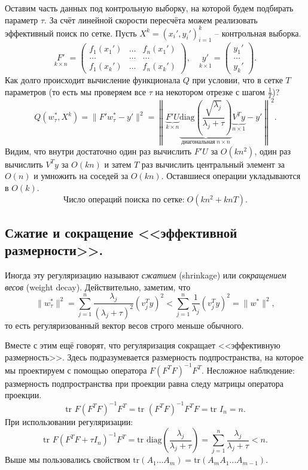 Оставим часть данных под контрольную выборку, на которой будем подбирать параметр $\tau$. За счёт линейной скорости пересчёта можем реализовать эффективный поиск по сетке. Пусть $X^k = (x_i', y_i')_{i=1}^k$ -- контрольная выборка.
$$\underset{k \times n}{F'} = \begin{pmatrix}
    f_1(x_1') & \dots & f_n(x_1') \\
    \dots & \dots & \dots \\
    f_1(x_k') & \dots & f_n(x_k')
\end{pmatrix}, \quad \underset{k \times 1}{y'} = \begin{pmatrix}
    y_1' \\
    \dots \\
    y_k'
\end{pmatrix}.$$
Как долго происходит вычисление функционала $Q$ при условии, что в сетке $T$ параметров (то есть мы проверяем все $\tau$ на некотором отрезке с шагом $\frac{1}{T}$)?
$$Q(w_\tau^*, X^k) = \|F'w_\tau^* - y'\|^2 = \left\|\underset{k \times n}{\underbrace{F'U}} \underset{\text{диагональная} \; n \times n}{\underbrace{\text{diag}\left(\frac{\sqrt{\lambda_j}}{\lambda_j + \tau}\right)}}\underset{n \times 1}{\underbrace{V^Ty}} - y'\right\|^2.$$
Видим, что внутри достаточно один раз вычислить $F'U$ за $O(kn^2)$, один раз вычислить $V^Ty$ за $O(kn)$ и затем $T$ раз вычислить центральный элемент за $O(n)$ и умножить на соседей за $O(kn)$. Оставшиеся операции укладываются в $O(k)$.
$$\text{Число операций поиска по сетке:} \; O(kn^2 + knT).$$

\subsection*{Сжатие и сокращение <<эффективной размерности>>.}
Иногда эту регуляризацию называют \textit{сжатием} (shrinkage) или \textit{сокращением весов} (weight decay). Действительно, заметим, что
$$\|w_\tau^*\|^2 = \sum_{j=1}^n \frac{\lambda_j}{(\lambda_j + \tau)^2}(v_j^Ty)^2 < \sum_{j=1}^n \frac{1}{\lambda_j} (v_j^Ty)^2 = \|w^*\|^2,$$
то есть регуляризованный вектор весов строго меньше обычного.

Вместе с этим ещё говорят, что регуляризация сокращает <<эффективную размерность>>. Здесь подразумевается размерность подпространства, на которое мы проектируем с помощью оператора $F(F^TF)^{-1}F^T$. Несложное наблюдение: размерность подпространства при проекции равна следу матрицы оператора проекции.
$$\text{tr } F(F^TF)^{-1}F^T = \text{tr } (F^T F)^{-1} F^TF = \text{tr } I_n = n.$$
При использовании регуляризации:
$$\text{tr } F(F^TF + \tau I_n)^{-1}F^T = \text{tr } \text{diag}\left(\frac{\lambda_j}{\lambda_j + \tau}\right) = \sum_{j=1}^n \frac{\lambda_j}{\lambda_j + \tau} < n.$$
Выше мы пользовались свойством $\text{tr}(A_1 \dots A_m) = \text{tr}(A_m A_1 \dots A_{m-1})$.


